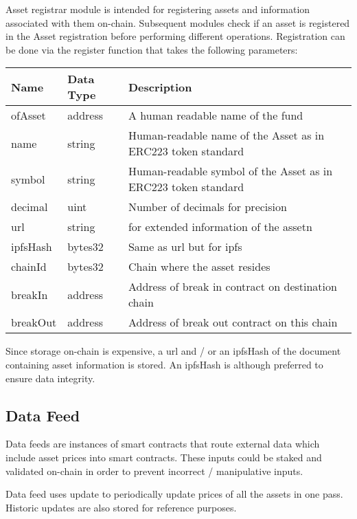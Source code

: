 \documentclass[conference]{IEEEtran}
\begin{document}
Asset registrar module is intended for registering assets and information associated with them on-chain. Subsequent modules check if an asset is registered in the Asset registration before performing different operations. Registration can be done via the register function that takes the following parameters:

\begin{center}
	\footnotesize
	\begin{tabular}{ | p{2.7cm} | p{0.8cm} | p{4cm} | }
		\hline
		Name & Data Type & Description \\ \hline
		ofAsset & address & A human readable name of the fund \\ \hline
		name & string & Human-readable name of the Asset as in ERC223 token standard \\ \hline
		symbol & string & Human-readable symbol of the Asset as in ERC223 token standard \\ \hline
		decimal & uint & Number of decimals for precision \\ \hline
		url & string & for extended information of the assetn \\ \hline
		ipfsHash & bytes32 & Same as url but for ipfs \\ \hline
		chainId & bytes32 & Chain where the asset resides \\ \hline
		breakIn & address & Address of break in contract on destination chain \\ \hline
		breakOut & address & Address of break out contract on this chain \\ \hline
	\end{tabular}
\end{center}

Since storage on-chain is expensive, a url and / or an ipfsHash of the document containing asset information is stored. An ipfsHash is although preferred to ensure data integrity.

\subsection{Data Feed}  \label{component:data-feed}

Data feeds are instances of smart contracts that route external data which include asset prices into smart contracts. These inputs could be staked and validated on-chain in order to prevent incorrect / manipulative inputs.  

Data feed uses update to periodically update prices of all the assets in one pass. Historic updates are also stored for reference purposes.
\end{document}
